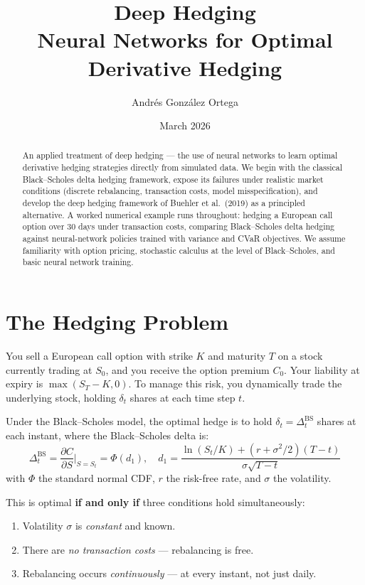 \documentclass[11pt, a4paper]{article}
\title{%
    \textbf{Deep Hedging} \\[0.5em]
    \large Neural Networks for Optimal Derivative Hedging
}
\author{Andr\'es Gonz\'alez Ortega}
\date{March 2026}
\theoremstyle{definition}
\theoremstyle{plain}
\theoremstyle{remark}
\begin{document}
\maketitle

\begin{abstract}
An applied treatment of deep hedging --- the use of neural networks to learn
optimal derivative hedging strategies directly from simulated data.
We begin with the classical Black--Scholes delta hedging framework, expose its failures
under realistic market conditions (discrete rebalancing, transaction costs, model misspecification),
and develop the deep hedging framework of Buehler et al.\ (2019) as a principled alternative.
A worked numerical example runs throughout: hedging a European call option over 30 days
under transaction costs, comparing Black--Scholes delta hedging against neural-network policies
trained with variance and CVaR objectives.
We assume familiarity with option pricing, stochastic calculus at the level of
Black--Scholes, and basic neural network training.
\end{abstract}

\tableofcontents
\newpage

\section{The Hedging Problem}
\label{sec:hedging-problem}

You sell a European call option with strike $K$ and maturity $T$ on a stock currently
trading at $S_0$, and you receive the option premium $C_0$.
Your liability at expiry is $\max(S_T - K, 0)$.
To manage this risk, you dynamically trade the underlying stock, holding
$\delta_t$ shares at each time step $t$.

Under the Black--Scholes model, the optimal hedge is to hold $\delta_t = \Delta_t^{\text{BS}}$
shares at each instant, where the Black--Scholes delta is:
\[
    \Delta_t^{\text{BS}} = \frac{\partial C}{\partial S}\bigg|_{S=S_t}
    = \Phi(d_1), \quad
    d_1 = \frac{\ln(S_t / K) + (r + \sigma^2/2)(T - t)}{\sigma\sqrt{T - t}}
\]
with $\Phi$ the standard normal CDF, $r$ the risk-free rate, and $\sigma$ the volatility.

This is optimal \textbf{if and only if} three conditions hold simultaneously:
\begin{enumerate}
    \item Volatility $\sigma$ is \emph{constant} and known.
    \item There are \emph{no transaction costs} --- rebalancing is free.
    \item Rebalancing occurs \emph{continuously} --- at every instant, not just daily.
\end{enumerate}
\end{document}
